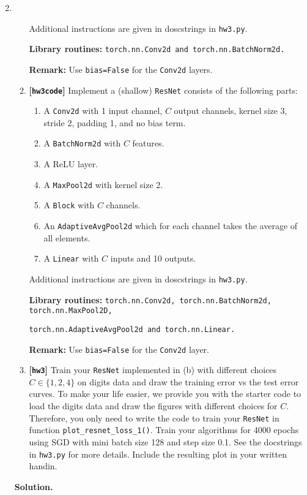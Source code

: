 \documentclass{article}
\def\hw{\textbf{[\texttt{hw3}]}\xspace}
\def\hwcode{\textbf{[\texttt{hw3code}]}\xspace}
\theoremstyle{definition}
\theoremstyle{remark}
\newenvironment{Q}
{%
\clearpage
\item
}
{%
\phantom{s} %
\bigskip
\textbf{Solution.}
}
\begin{document}
\begin{enumerate}[font={\Large\bfseries},left=0pt]
\begin{Q}
\begin{enumerate}
        Additional instructions are given in doscstrings in \texttt{hw3.py}.
        
        \textbf{Library routines:} \texttt{torch.nn.Conv2d and torch.nn.BatchNorm2d.}
        
        \textbf{Remark:} Use \texttt{bias=False} for the \texttt{Conv2d} layers.

        \item \hwcode
          Implement a (shallow) \texttt{ResNet} consists of the following parts:
        \begin{enumerate}
            \item A \texttt{Conv2d} with 1 input channel, $C$ output channels, kernel size 3, stride 2, padding 1, and no bias term.
            \item A \texttt{BatchNorm2d} with $C$ features.
            \item A ReLU layer.
            \item A \texttt{MaxPool2d} with kernel size 2.
            \item A \texttt{Block} with $C$ channels.
            \item An \texttt{AdaptiveAvgPool2d} which for each channel takes the average of all elements.
            \item A \texttt{Linear} with $C$ inputs and 10 outputs.
        \end{enumerate}
        Additional instructions are given in doscstrings in \texttt{hw3.py}.
        
        \textbf{Library routines:} \texttt{torch.nn.Conv2d, torch.nn.BatchNorm2d, torch.nn.MaxPool2D,}
        
        \texttt{torch.nn.AdaptiveAvgPool2d and torch.nn.Linear.}
        
        \textbf{Remark:} Use \texttt{bias=False} for the \texttt{Conv2d} layer.
        
        
        \item \hw  Train your \texttt{ResNet} implemented in (b) with different choices $C\in\{1,2,4\}$ on digits data and draw the training error vs the test error curves. To make your life easier, we provide you with the starter code to load the digits data and draw the figures with different choices for $C$. Therefore, you only need to write the code to train your \texttt{ResNet} in  function \texttt{plot\_resnet\_loss\_1()}. Train your algorithms for 4000 epochs using SGD with mini batch size 128 and step size 0.1. See the docstrings in \texttt{hw3.py} for more details.  Include the resulting plot in your written handin. 
        

\end{enumerate}
\end{Q}
\end{enumerate}
\end{document}
